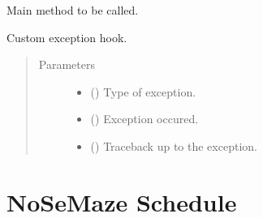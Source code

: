 \documentclass[letterpaper,10pt,english]{sphinxmanual}
\begin{document}

\begin{fulllineitems}
\label{\detokenize{NoSeMazeController/main:main.main}}
\pysigstartsignatures
{}
\pysigstopsignatures
\sphinxAtStartPar
Main method to be called.

\end{fulllineitems}


\begin{fulllineitems}
\label{\detokenize{NoSeMazeController/main:main.my_exception_hook}}
\pysigstartsignatures
{}
\pysigstopsignatures
\sphinxAtStartPar
Custom exception hook.
\begin{quote}\begin{description}
\item[{Parameters}] \leavevmode\begin{itemize}
\item {} 
\sphinxAtStartPar
{} () \textendash{} Type of exception.

\item {} 
\sphinxAtStartPar
{} () \textendash{} Exception occured.

\item {} 
\sphinxAtStartPar
{} () \textendash{} Traceback up to the exception.

\end{itemize}

\end{description}\end{quote}

\end{fulllineitems}


\sphinxstepscope


\chapter{NoSeMaze Schedule}
\label{\detokenize{NoSeMazeSchedule:nosemaze-schedule}}\label{\detokenize{NoSeMazeSchedule::doc}}
\sphinxstepscope
\end{document}
